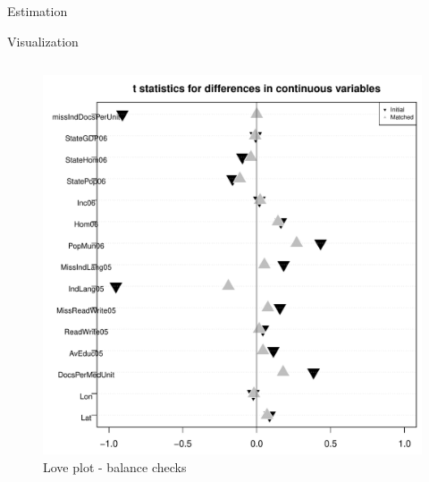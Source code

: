 \documentclass[final]{beamer}
\newlength{\onecolwid}
\newlength{\twocolwid}
\begin{document}
\begin{frame}[t]
\begin{columns}[t]
\begin{column}{\twocolwid}
\begin{block}{Estimation}
      \end{block}
      \begin{block}{ Visualization }	
        \begin{columns}[t,totalwidth=\twocolwid]
          \begin{column}{\onecolwid}
            \begin{figure}[htdp]
              \includegraphics[scale=1]{../Images/FinalLoveplot.pdf}
              \caption*{Love plot - balance checks}
            \end{figure}

\end{column}
\end{columns}
\end{block}
\end{column}
\end{columns}
\end{frame}
\end{document}
